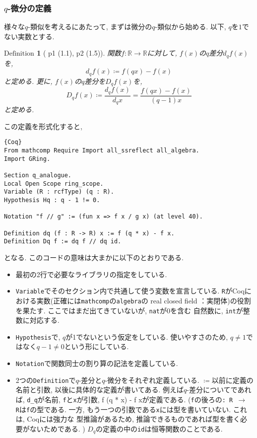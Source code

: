 \documentclass[11pt]{jarticle}
\theoremstyle{mystyle}
\newtheorem{df}{$\textrm{Definition}$}[subsubsection]
\newcommand{\bdf}{\begin{shadebox} \begin{df}}
\newcommand{\edf}{\end{df} \end{shadebox}}
\newcommand{\R}{\mathbb{R}}
\newcommand{\0}{\textbf{0}}
\newcommand{\1}{\textbf{1}}
\newcommand{\2}{\textbf{2}}
\begin{document}
\subsubsection{$q$-微分の定義}
様々な$q$-類似を考えるにあたって, まずは微分の$q$-類似から始める. 以下, $q$を$1$でない実数とする. 
\bdf[\cite{Kac} p1 (1.1), p2 (1.5)]
  関数$f : \R \to \R$に対して, $f(x)$の$q$差分$d_q f(x)$を, 
  \[
    d_q f(x) \coloneqq f (qx) - f(x)
  \]
  と定める. 更に, $f(x)$の$q$差分を$D_q f(x)$を, 
  \[
    D_q f(x) \coloneqq \frac{d_q f(x)}{d_q x} = \frac{f(qx) - f(x)}{(q - 1) x}
  \]
  と定める. 
\edf
この定義を形式化すると, 
\begin{lstlisting}{Coq}
From mathcomp Require Import all_ssreflect all_algebra.
Import GRing.

Section q_analogue.
Local Open Scope ring_scope.
Variable (R : rcfType) (q : R).
Hypothesis Hq : q - 1 != 0.

Notation "f // g" := (fun x => f x / g x) (at level 40).

Definition dq (f : R -> R) x := f (q * x) - f x.
Definition Dq f := dq f // dq id. 
\end{lstlisting}
となる. このコードの意味は大まかに以下のとおりである. 
\begin{itemize}
  \item 最初の2行で必要なライブラリの指定をしている. 
  \item {\tt Variable}でそのセクション内で共通して使う変数を宣言している. 
          {\tt R}がCoqにおける実数(正確には{\tt mathcomp}の{\tt algebra}の real closed field
          ：実閉体)の役割を果たす. ここではまだ出てきていないが, {\tt nat}が$0$を含む
          自然数に, {\tt int}が整数に対応する. 
  \item {\tt Hypothesis}で, $q$が1でないという仮定をしている. 使いやすさのため, 
          $q \ne 1$ではなく$q - 1 \ne 0$という形にしている. 
  \item {\tt Notation}で関数同士の割り算の記法を定義している. 
  \item 2つの{\tt Definition}で$q$-差分と$q$-微分をそれぞれ定義している. 
          {\tt $\coloneqq$}以前に定義の名前と引数, 以後に具体的な定義が書いてある. 
          例えば$q$-差分についてであれば, {\tt d\_q}が名前, {\tt f}と{\tt x}が引数, 
          {f (q * x) - f x}が定義である. ({\tt f}の後ろの{\tt : R $\to$ R}は{\tt f}の型である. 
          一方, もう一つの引数である{\tt x}には型を書いていない. これは, Coqには強力な
          型推論があるため, 推論できるものであれば型を書く必要がないためである. )
          $D_q$の定義の中の{\tt id}は恒等関数のことである. 
\end{itemize}
\end{document}
